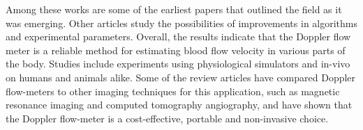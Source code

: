 Among these works are some of the earliest papers that outlined the field as it was emerging. Other articles study the possibilities of improvements in algorithms and experimental parameters. Overall, the results indicate that the Doppler flow meter is a reliable method for estimating blood flow velocity in various parts of the body. Studies include experiments using physiological simulators and in-vivo on humans and animals alike. Some of the review articles have compared Doppler flow-meters to other imaging techniques for this application, such as magnetic resonance imaging and computed tomography angiography, and have shown that the Doppler flow-meter is a cost-effective, portable and non-invasive choice.
%
